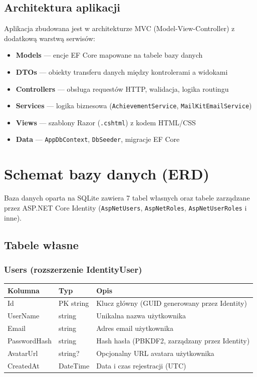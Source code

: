 \documentclass[12pt,a4paper]{article}
\newcommand{\code}[1]{\texttt{\small#1}}
\begin{document}
\subsection{Architektura aplikacji}

Aplikacja zbudowana jest w architekturze MVC (Model-View-Controller) z dodatkową warstwą serwisów:

\begin{itemize}[leftmargin=1.5cm]
  \item \textbf{Models} --- encje EF Core mapowane na tabele bazy danych
  \item \textbf{DTOs} --- obiekty transferu danych między kontrolerami a widokami
  \item \textbf{Controllers} --- obsługa requestów HTTP, walidacja, logika routingu
  \item \textbf{Services} --- logika biznesowa (\code{AchievementService}, \code{MailKitEmailService})
  \item \textbf{Views} --- szablony Razor (\code{.cshtml}) z kodem HTML/CSS
  \item \textbf{Data} --- \code{AppDbContext}, \code{DbSeeder}, migracje EF Core
\end{itemize}

\section{Schemat bazy danych (ERD)}

Baza danych oparta na SQLite zawiera 7 tabel własnych oraz tabele zarządzane przez
ASP.NET Core Identity (\code{AspNetUsers}, \code{AspNetRoles}, \code{AspNetUserRoles} i inne).

\subsection{Tabele własne}

\subsubsection{Users (rozszerzenie IdentityUser)}

\begin{longtable}{>{\ttfamily}p{3.5cm} p{3cm} p{7cm}}
  \toprule
  \normalfont\textbf{Kolumna} & \textbf{Typ} & \textbf{Opis} \\
  \midrule
  \endhead
  Id        & PK string   & Klucz główny (GUID generowany przez Identity) \\[3pt]
  UserName  & string      & Unikalna nazwa użytkownika \\[3pt]
  Email     & string      & Adres email użytkownika \\[3pt]
  PasswordHash & string   & Hash hasła (PBKDF2, zarządzany przez Identity) \\[3pt]
  AvatarUrl & string?     & Opcjonalny URL avatara użytkownika \\[3pt]
  CreatedAt & DateTime    & Data i czas rejestracji (UTC) \\
  \bottomrule
\end{longtable}
\end{document}
